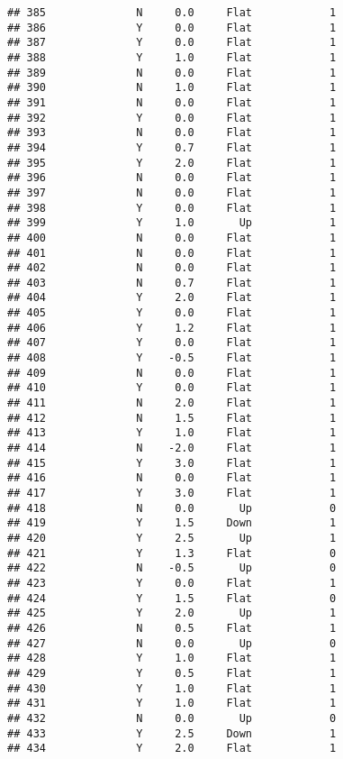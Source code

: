 \documentclass[
]{article}
\begin{document}
\begin{verbatim}
## 385              N     0.0     Flat            1
## 386              Y     0.0     Flat            1
## 387              Y     0.0     Flat            1
## 388              Y     1.0     Flat            1
## 389              N     0.0     Flat            1
## 390              N     1.0     Flat            1
## 391              N     0.0     Flat            1
## 392              Y     0.0     Flat            1
## 393              N     0.0     Flat            1
## 394              Y     0.7     Flat            1
## 395              Y     2.0     Flat            1
## 396              N     0.0     Flat            1
## 397              N     0.0     Flat            1
## 398              Y     0.0     Flat            1
## 399              Y     1.0       Up            1
## 400              N     0.0     Flat            1
## 401              N     0.0     Flat            1
## 402              N     0.0     Flat            1
## 403              N     0.7     Flat            1
## 404              Y     2.0     Flat            1
## 405              Y     0.0     Flat            1
## 406              Y     1.2     Flat            1
## 407              Y     0.0     Flat            1
## 408              Y    -0.5     Flat            1
## 409              N     0.0     Flat            1
## 410              Y     0.0     Flat            1
## 411              N     2.0     Flat            1
## 412              N     1.5     Flat            1
## 413              Y     1.0     Flat            1
## 414              N    -2.0     Flat            1
## 415              Y     3.0     Flat            1
## 416              N     0.0     Flat            1
## 417              Y     3.0     Flat            1
## 418              N     0.0       Up            0
## 419              Y     1.5     Down            1
## 420              Y     2.5       Up            1
## 421              Y     1.3     Flat            0
## 422              N    -0.5       Up            0
## 423              Y     0.0     Flat            1
## 424              Y     1.5     Flat            0
## 425              Y     2.0       Up            1
## 426              N     0.5     Flat            1
## 427              N     0.0       Up            0
## 428              Y     1.0     Flat            1
## 429              Y     0.5     Flat            1
## 430              Y     1.0     Flat            1
## 431              Y     1.0     Flat            1
## 432              N     0.0       Up            0
## 433              Y     2.5     Down            1
## 434              Y     2.0     Flat            1

\end{verbatim}
\end{document}
